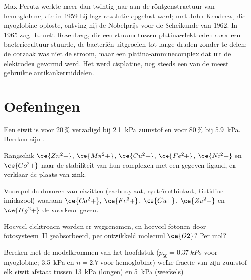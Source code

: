 \begin{history}
Max Perutz werkte meer dan twintig jaar aan de röntgenstructuur van
hemoglobine, die in 1959 bij lage resolutie opgelost werd; met John
Kendrew, die myoglobine oploste, ontving hij de Nobelprijs voor de
Scheikunde van 1962. In 1965 zag Barnett Rosenberg, die een stroom
tussen platina-elektroden door een bacteriecultuur stuurde, de bacteriën
uitgroeien tot lange draden zonder te delen; de oorzaak was niet de
stroom, maar een platina-amminecomplex dat uit de elektroden gevormd
werd. Het werd cisplatine, nog steeds een van de meest gebruikte
antikankermiddelen.
\end{history}

\section{Oefeningen}

\begin{exercise}[$\star$]\label{exo:b3:bioinorganic:1}
Een eiwit is voor 20\,\% verzadigd bij \qty{2.1}{kPa} zuurstof en voor 80\,\% bij \qty{5.9}{kPa}. Bereken zijn
.
\end{exercise}

\begin{exercise}[$\star$]\label{exo:b3:bioinorganic:2}
Rangschik $\ce{Zn^2+}$, $\ce{Mn^2+}$, $\ce{Cu^2+}$, $\ce{Fe^2+}$, $\ce{Ni^2+}$ en $\ce{Co^2+}$ naar de stabiliteit van hun complexen met
een gegeven ligand, en verklaar de plaats van zink.
\end{exercise}

\begin{exercise}[$\star$]\label{exo:b3:bioinorganic:3}
Voorspel de donoren van eiwitten (carboxylaat, cysteïnethiolaat,
histidine-imidazool) waaraan $\ce{Ca^2+}$, $\ce{Fe^3+}$, $\ce{Cu+}$, $\ce{Zn^2+}$ en $\ce{Hg^2+}$ de voorkeur geven.
\end{exercise}

\begin{exercise}[$\star$]\label{exo:b3:bioinorganic:4}
Hoeveel elektronen worden er weggenomen, en hoeveel fotonen door
fotosysteem~II geabsorbeerd,
per ontwikkeld molecuul $\ce{O2}$? Per mol?
\end{exercise}

\begin{exercise}[$\star\star$]\label{exo:b3:bioinorganic:5}
Bereken met de modelkrommen van het hoofdstuk ($p_{50} = \qty{0.37}{kPa}$ voor myoglobine; \qty{3.5}{kPa} en $n = 2.7$ voor
hemoglobine) welke fractie van zijn zuurstof elk eiwit afstaat tussen
\qty{13}{kPa} (longen) en \qty{5}{kPa} (weefsels).
\end{exercise}

